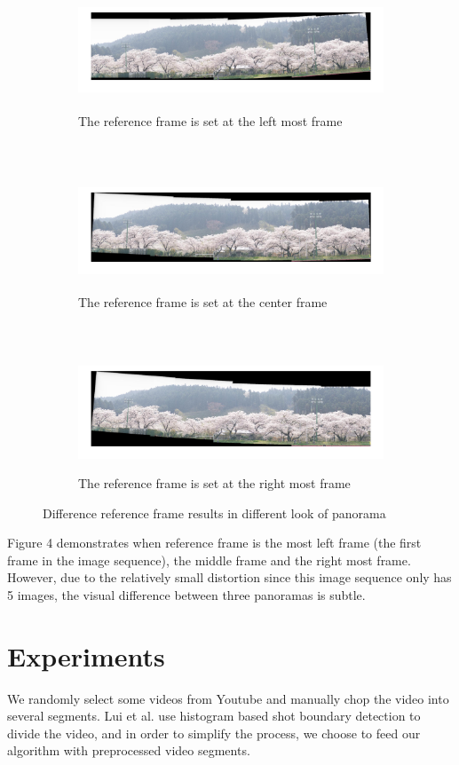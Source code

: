 \documentclass[12pt]{article}
\begin{document}
\begin{figure}[h]
	\centering
		\begin{subfigure}{1\textwidth}
		\centering
			\includegraphics[height=3.5cm, width=15cm]{ref1}
			\caption{The reference frame is set at the left most frame}
			\label{fig:ref1}
		\end{subfigure}
		~
		\begin{subfigure}{1\textwidth}
		\centering
			\includegraphics[height=3.5cm, width=15cm]{ref3}
			\caption{The reference frame is set at the center frame}
			\label{fig:ref3}
		\end{subfigure}
		~
				\begin{subfigure}{1\textwidth}
		\centering
			\includegraphics[height=3.5cm, width=15cm]{ref5}
			\caption{The reference frame is set at the right most frame}
			\label{fig:ref5}
		\end{subfigure}
		\caption{Difference reference frame results in different look of panorama}
\end{figure}
Figure 4 demonstrates when reference frame is the most left frame (the first frame in the image sequence), the middle frame and the right most frame. However, due to the relatively small distortion since this image sequence only has 5 images, the visual difference between three panoramas is subtle. 

\section{Experiments}
We randomly select some videos from Youtube and manually chop the video into several segments. Lui et al. use histogram based shot boundary detection to divide the video, and in order to simplify the process, we choose to feed our algorithm with preprocessed video segments.
\end{document}
